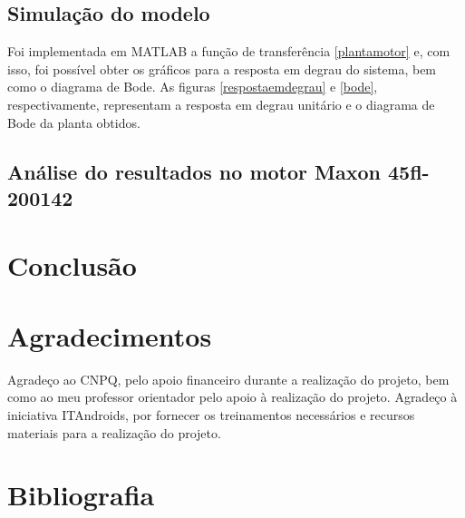\documentclass[a4paper,11pt]{article}
\begin{document}
		\newpage
		
		\subsection{Simulação do modelo}
		
		Foi implementada em MATLAB\cite{MATLAB} a função de transferência \ref{plantamotor} e, com isso, foi possível obter os gráficos para a resposta em degrau do sistema, bem como o diagrama de Bode. As figuras \ref{respostaemdegrau} e \ref{bode}, respectivamente, representam a resposta em degrau unitário e o diagrama de Bode da planta obtidos.
		
		\subsection{Análise do resultados no motor Maxon 45fl-200142}
	\section{Conclusão}
	
	\section{Agradecimentos}
	Agradeço ao CNPQ, pelo apoio financeiro durante a realização do projeto, bem como ao meu professor orientador pelo apoio à realização do projeto. Agradeço à iniciativa ITAndroids, por fornecer os treinamentos necessários e recursos materiais para a realização do projeto.
	
	\section{Bibliografia}
	\printbibliography[heading=none]
	
\end{document}
